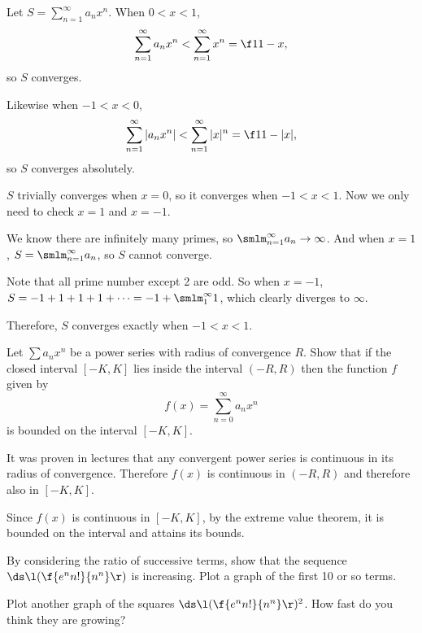 \documentclass[a4paper]{article}
\begin{document}
Let $S = \sum_{n=1}^\infty a_n x^n$. When $0 < x < 1$, \[
\sum_{n=1}^\infty a_n x^n < \sum_{n=1}^\infty x^n = \f1{1-x},
\] so $S$ converges.

Likewise when $-1 < x < 0$, \[
\sum_{n=1}^\infty |a_n x^n| < \sum_{n=1}^\infty |x|^n = \f1{1-|x|},
\] so $S$ converges absolutely.

$S$ trivially converges when $x=0$, so it converges when $-1 < x < 1$. Now we only need to check $x=1$ and $x=-1$.

We know there are infinitely many primes, so $\smlm_{n=1}^\infty a_n \to \infty$. And when $x = 1$, $S = \smlm_{n=1}^\infty a_n$, so $S$ cannot converge.

Note that all prime number except 2 are odd. So when $x = -1$, $S = -1 + 1 + 1 + 1 + \cdots = -1 + \smlm_1^\infty 1$, which clearly diverges to $\infty$.

Therefore, $S$ converges exactly when $-1 < x < 1$.


\begin{questionbody}
Let $\sum a_n x^n$ be a power series with radius of convergence $R$. Show that if the closed interval $[-K, K]$ lies inside the interval $(-R, R)$ then the function $f$ given by \[
f(x) = \sum_{n=0}^\infty a_n x^n
\] is bounded on the interval $[-K, K]$.
\end{questionbody}


It was proven in lectures that any convergent power series is continuous in its radius of convergence. Therefore $f(x)$ is continuous in $(-R, R)$ and therefore also in $[-K, K]$.

Since $f(x)$ is continuous in $[-K, K]$, by the extreme value theorem, it is bounded on the interval and attains its bounds.


\begin{questionbody}
By considering the ratio of successive terms, show that the sequence $\ds\l( \f{e^n n!}{n^n} \r)$ is increasing. Plot a graph of the first 10 or so terms.

Plot another graph of the squares $\ds\l( \f{e^n n!}{n^n} \r)^2$. How fast do you think they are growing?
\end{questionbody}
\end{document}
